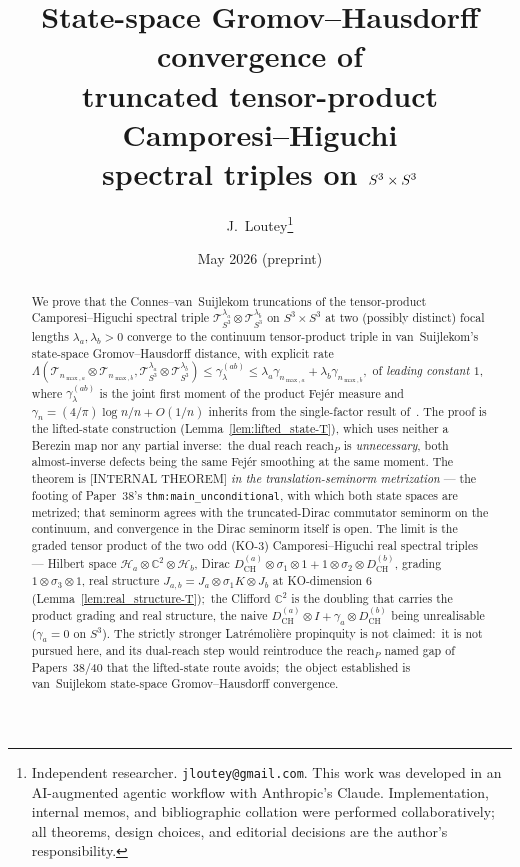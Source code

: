 \documentclass[11pt,a4paper]{article}
\title{State-space Gromov--Hausdorff convergence of \\
truncated tensor-product Camporesi--Higuchi \\
spectral triples on $\sthree \times \sthree$}
\author{J.~Loutey\thanks{Independent researcher. \texttt{jloutey@gmail.com}.
This work was developed in an AI-augmented agentic workflow with
Anthropic's Claude. Implementation, internal memos, and bibliographic
collation were performed collaboratively; all theorems, design choices,
and editorial decisions are the author's responsibility.}}
\date{May 2026 (preprint)}
\theoremstyle{plain}
\theoremstyle{definition}
\newcommand{\nmaxa}{n_{\max,a}}
\newcommand{\nmaxb}{n_{\max,b}}
\newcommand{\sthree}{S^{3}}
\newcommand{\Hilb}{\mathcal{H}}
\newcommand{\Tcal}{\mathcal{T}}
\newcommand{\C}{\mathbb{C}}
\newcommand{\DCH}{D_{\mathrm{CH}}}
\begin{document}
\maketitle

\begin{abstract}
We prove that the Connes--van~Suijlekom truncations of the
tensor-product Camporesi--Higuchi spectral triple
$\Tcal_{\sthree}^{\lambda_a} \otimes \Tcal_{\sthree}^{\lambda_b}$ on
$\sthree \times \sthree$ at two (possibly distinct) focal lengths
$\lambda_a, \lambda_b > 0$ converge to the continuum tensor-product
triple in van~Suijlekom's state-space Gromov--Hausdorff distance,
with explicit rate
\(
   \Lambda(\Tcal_{\nmaxa} \otimes \Tcal_{\nmaxb},
            \Tcal_{\sthree}^{\lambda_a} \otimes \Tcal_{\sthree}^{\lambda_b})
   \le \gamma^{(ab)}_\lambda
   \le \lambda_a \gamma_{\nmaxa} + \lambda_b \gamma_{\nmaxb},
\)
of \emph{leading constant $1$}, where $\gamma^{(ab)}_\lambda$ is the joint
first moment of the product Fej\'er measure and
$\gamma_n = (4/\pi)\log n / n + O(1/n)$ inherits from the single-factor
result of~\cite{loutey_paper38}. The proof is the lifted-state
construction (Lemma~\ref{lem:lifted_state-T}), which uses neither a Berezin
map nor any partial inverse:\ the dual reach $\mathrm{reach}_P$ is
\emph{unnecessary}, both almost-inverse defects being the same Fej\'er
smoothing at the same moment. The theorem is [INTERNAL THEOREM] \emph{in the
translation-seminorm metrization} --- the footing of Paper~38's
\texttt{thm:main\_unconditional}, with which both state spaces are metrized;
that seminorm agrees with the truncated-Dirac commutator seminorm on the
continuum, and convergence in the Dirac seminorm itself is open. The limit is
the graded tensor product of the two odd (KO-$3$) Camporesi--Higuchi real
spectral triples --- Hilbert space $\Hilb_a \otimes \C^2 \otimes \Hilb_b$,
Dirac $\DCH^{(a)}\otimes\sigma_1\otimes 1 + 1\otimes\sigma_2\otimes\DCH^{(b)}$,
grading $1\otimes\sigma_3\otimes 1$, real structure
$J_{a,b} = J_a\otimes\sigma_1 K\otimes J_b$ at KO-dimension $6$
(Lemma~\ref{lem:real_structure-T});\ the Clifford $\C^2$ is the doubling
that carries the product grading and real structure, the naive
$\DCH^{(a)}\otimes I + \gamma_a\otimes\DCH^{(b)}$ being unrealisable
($\gamma_a = 0$ on $\sthree$). The strictly stronger Latr\'emoli\`ere
propinquity is not claimed:\ it is not pursued here, and its dual-reach step
would reintroduce the $\mathrm{reach}_P$ named gap of Papers~38/40 that the
lifted-state route avoids;\ the object established is van~Suijlekom
state-space Gromov--Hausdorff convergence.


\end{abstract}
\end{document}
